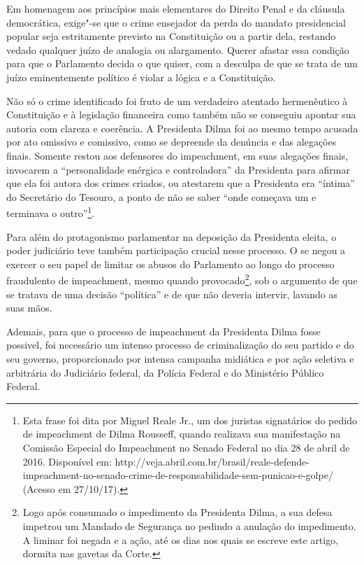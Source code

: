 Em homenagem aos princípios mais elementares do Direito Penal e da
cláusula democrática, exige"-se que o crime ensejador da perda do mandato
presidencial popular seja estritamente previsto na Constituição ou a
partir dela, restando vedado qualquer juízo de analogia ou alargamento.
Querer afastar essa condição para que o Parlamento decida o que quiser,
com a desculpa de que se trata de um juízo eminentemente político é
violar a lógica e a Constituição.

Não só o crime identificado foi fruto de um verdadeiro atentado
hermenêutico à Constituição e à legislação financeira como também não se
conseguiu apontar sua autoria com clareza e coerência. A Presidenta
Dilma foi ao mesmo tempo acusada por ato omissivo e comissivo, como se
depreende da denúncia e das alegações finais. Somente restou aos
defensores do impeachment, em suas alegações finais, invocarem a
``personalidade enérgica e controladora'' da Presidenta para afirmar que
ela foi autora dos crimes criados, ou atestarem que a Presidenta era
``íntima'' do Secretário do Tesouro, a ponto de não se saber ``onde
começava um e terminava o outro''\footnote{Esta frase foi dita por Miguel
  Reale Jr., um dos juristas signatários do pedido de impeachment de
  Dilma Rousseff, quando realizava sua manifestação na Comissão Especial
  do Impeachment no Senado Federal no dia 28 de abril de 2016.
  Disponível em:
  http://veja.abril.com.br/brasil/reale-defende-impeachment-no-senado-crime-de-responsabilidade-sem-punicao-e-golpe/
  (Acesso em 27/10/17).}.

Para além do protagonismo parlamentar na deposição da Presidenta eleita,
o poder judiciário teve também participação crucial nesse processo. O
 se negou a exercer o seu papel de limitar os abusos do Parlamento ao
longo do processo fraudulento de impeachment, mesmo quando
provocado\footnote{Logo após consumado o impedimento da Presidenta
  Dilma, a sua defesa impetrou um Mandado de Segurança no  pedindo a
  anulação do impedimento. A liminar foi negada e a ação, até os dias
  nos quais se escreve este artigo, dormita nas gavetas da Corte.}, sob
o argumento de que se tratava de uma decisão ``política'' e de que não
deveria intervir, lavando as suas mãos.

Ademais, para que o processo de impeachment da Presidenta Dilma fosse
possivel, foi necessário um intenso processo de criminalização do seu
partido e do seu governo, proporcionado por intensa campanha midiática e
por ação seletiva e arbitrária do Judiciário federal, da Polícia Federal
e do Ministério Público Federal.

